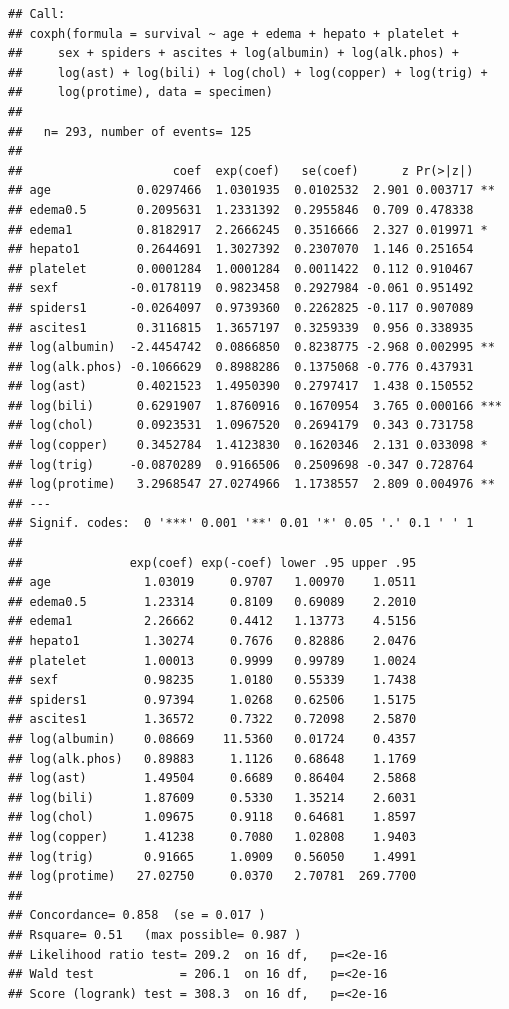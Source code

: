 \documentclass[]{article}
\begin{document}
\begin{verbatim}
## Call:
## coxph(formula = survival ~ age + edema + hepato + platelet + 
##     sex + spiders + ascites + log(albumin) + log(alk.phos) + 
##     log(ast) + log(bili) + log(chol) + log(copper) + log(trig) + 
##     log(protime), data = specimen)
## 
##   n= 293, number of events= 125 
## 
##                     coef  exp(coef)   se(coef)      z Pr(>|z|)    
## age            0.0297466  1.0301935  0.0102532  2.901 0.003717 ** 
## edema0.5       0.2095631  1.2331392  0.2955846  0.709 0.478338    
## edema1         0.8182917  2.2666245  0.3516666  2.327 0.019971 *  
## hepato1        0.2644691  1.3027392  0.2307070  1.146 0.251654    
## platelet       0.0001284  1.0001284  0.0011422  0.112 0.910467    
## sexf          -0.0178119  0.9823458  0.2927984 -0.061 0.951492    
## spiders1      -0.0264097  0.9739360  0.2262825 -0.117 0.907089    
## ascites1       0.3116815  1.3657197  0.3259339  0.956 0.338935    
## log(albumin)  -2.4454742  0.0866850  0.8238775 -2.968 0.002995 ** 
## log(alk.phos) -0.1066629  0.8988286  0.1375068 -0.776 0.437931    
## log(ast)       0.4021523  1.4950390  0.2797417  1.438 0.150552    
## log(bili)      0.6291907  1.8760916  0.1670954  3.765 0.000166 ***
## log(chol)      0.0923531  1.0967520  0.2694179  0.343 0.731758    
## log(copper)    0.3452784  1.4123830  0.1620346  2.131 0.033098 *  
## log(trig)     -0.0870289  0.9166506  0.2509698 -0.347 0.728764    
## log(protime)   3.2968547 27.0274966  1.1738557  2.809 0.004976 ** 
## ---
## Signif. codes:  0 '***' 0.001 '**' 0.01 '*' 0.05 '.' 0.1 ' ' 1
## 
##               exp(coef) exp(-coef) lower .95 upper .95
## age             1.03019     0.9707   1.00970    1.0511
## edema0.5        1.23314     0.8109   0.69089    2.2010
## edema1          2.26662     0.4412   1.13773    4.5156
## hepato1         1.30274     0.7676   0.82886    2.0476
## platelet        1.00013     0.9999   0.99789    1.0024
## sexf            0.98235     1.0180   0.55339    1.7438
## spiders1        0.97394     1.0268   0.62506    1.5175
## ascites1        1.36572     0.7322   0.72098    2.5870
## log(albumin)    0.08669    11.5360   0.01724    0.4357
## log(alk.phos)   0.89883     1.1126   0.68648    1.1769
## log(ast)        1.49504     0.6689   0.86404    2.5868
## log(bili)       1.87609     0.5330   1.35214    2.6031
## log(chol)       1.09675     0.9118   0.64681    1.8597
## log(copper)     1.41238     0.7080   1.02808    1.9403
## log(trig)       0.91665     1.0909   0.56050    1.4991
## log(protime)   27.02750     0.0370   2.70781  269.7700
## 
## Concordance= 0.858  (se = 0.017 )
## Rsquare= 0.51   (max possible= 0.987 )
## Likelihood ratio test= 209.2  on 16 df,   p=<2e-16
## Wald test            = 206.1  on 16 df,   p=<2e-16
## Score (logrank) test = 308.3  on 16 df,   p=<2e-16
\end{verbatim}
\end{document}
